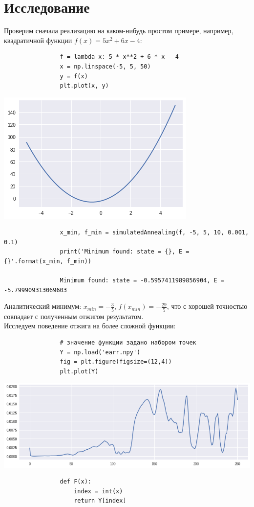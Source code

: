 \documentclass[a4paper]{article}
\begin{document}
		\section{Исследование}
			Проверим сначала реализацию на каком-нибудь простом примере, например, квадратичной функции $f(x) = 5x^2 + 6x - 4$:
			\begin{verbatim}
				f = lambda x: 5 * x**2 + 6 * x - 4
				x = np.linspace(-5, 5, 50)
				y = f(x)
				plt.plot(x, y)
			\end{verbatim}
			\includegraphics[width=0.5\linewidth]{parabola}
			\begin{verbatim}
				x_min, f_min = simulatedAnnealing(f, -5, 5, 10, 0.001, 0.1)
				print('Minimum found: state = {}, E = {}'.format(x_min, f_min))
				
				Minimum found: state = -0.5957411989856904, E = -5.799909313069603
			\end{verbatim}
			Аналитический минимум: $x_{min} = -\frac{3}{5}$, $f(x_{min}) = -\frac{29}{5} $, что с хорошей точностью совпадает с полученным отжигом результатом. \\
			Исследуем поведение отжига на более сложной функции:
			\begin{verbatim}
				# значение функции задано набором точек
				Y = np.load('earr.npy')
				fig = plt.figure(figsize=(12,4))
				plt.plot(Y)
			\end{verbatim}
			\includegraphics[width=\linewidth]{earr-1}
			\newpage
			\begin{verbatim}
				def F(x):
					index = int(x)
					return Y[index]
			\end{verbatim}
\end{document}
